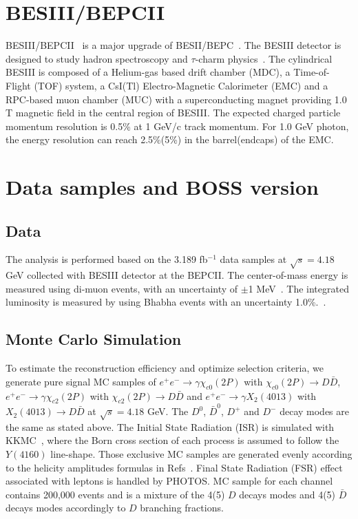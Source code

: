\documentclass[aps,preprint,tightenlines,superscriptaddress,showpacs,byrevtex,amsmath,amssymb,nofloatfix]{revtex4}
\begin{document}
\section{BESIII/BEPCII}

BESIII/BEPCII~\cite{bepc2} is a major upgrade of
BESII/BEPC~\cite{bepc}. The BESIII detector is designed to study
hadron spectroscopy and $\tau$-charm physics~\cite{bes3yellow}. The
cylindrical BESIII is composed of a Helium-gas based drift chamber
(MDC), a Time-of-Flight (TOF) system, a CsI(Tl) Electro-Magnetic
Calorimeter (EMC) and a RPC-based muon chamber (MUC) with a
superconducting magnet providing 1.0 T magnetic field in the central
region of BESIII. The expected charged particle momentum resolution is 0.5\% at 1 GeV/c track momentum. For 1.0 GeV photon,
the energy resolution can reach 2.5\%(5\%) in the barrel(endcaps) of the EMC.


\section{Data samples and BOSS version}

\subsection{Data}

  The analysis is performed based on the 3.189 fb$^{-1}$ data samples at $\sqrt{s}=4.18$ GeV collected with BESIII detector at the BEPCII. The center-of-mass energy is measured using di-muon events, with an uncertainty of $\pm$1 MeV~\cite{ecms_4180}. The integrated luminosity is measured by using Bhabha events with an uncertainty 1.0\%.~\cite{limu_4180}.


\subsection{Monte Carlo Simulation}

To estimate the reconstruction efficiency and optimize selection criteria, we generate pure signal MC samples of $e^{+}e^{-} \rightarrow \gamma \chi_{c0}(2P)$ with $\chi_{c0}(2P) \rightarrow D\bar{D}$, $e^{+}e^{-} \rightarrow \gamma \chi_{c2}(2P)$ with $\chi_{c2}(2P) \rightarrow D\bar{D}$ and $e^{+}e^{-} \rightarrow \gamma X_{2}(4013)$ with $X_{2}(4013) \rightarrow D\bar{D}$  at $\sqrt{s} = 4.18$ GeV.  The $D^{0}$, $\bar{D}^{0}$, $D^{+}$ and $D^{-}$ decay modes are the same as stated above.  The Initial State Radiation (ISR) is simulated with {\sc KKMC}~\cite{KKMC}, where the Born cross section of each process is assumed to follow the $Y(4160)$ line-shape. Those exclusive MC samples are generated evenly according to the helicity amplitudes formulas in Refs~\cite{amplitude}. Final State Radiation (FSR) effect associated with leptons is handled by {\sc PHOTOS}. MC sample for each channel contains 200,000 events and is a mixture of the 4(5) $D$ decays modes and 4(5) $\bar{D}$ decays modes accordingly to $D$ branching fractions.
\end{document}

